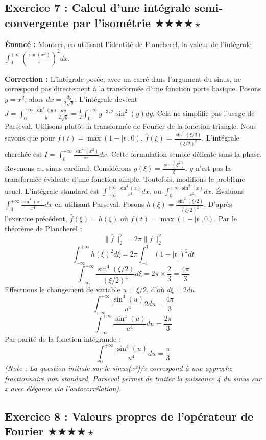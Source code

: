 \documentclass[11pt,a4paper]{article}
\begin{document}
\subsection*{Exercice 7 : Calcul d'une intégrale semi-convergente par l'isométrie \quad $\bigstar\bigstar\bigstar\bigstar\star$}

\textbf{Énoncé :}
Montrer, en utilisant l'identité de Plancherel, la valeur de l'intégrale $\int_0^{+\infty} \left(\frac{\sin(x^2)}{x}\right)^2 dx$.

\textbf{Correction :}
L'intégrale posée, avec un carré dans l'argument du sinus, ne correspond pas directement à la transformée d'une fonction porte basique. Posons $y = x^2$, alors $dx = \frac{dy}{2\sqrt{y}}$.
L'intégrale devient $J = \int_0^{+\infty} \frac{\sin^2(y)}{y} \frac{dy}{2\sqrt{y}} = \frac{1}{2} \int_0^{+\infty} y^{-3/2} \sin^2(y) dy$. Cela ne simplifie pas l'usage de Parseval.
Utilisons plutôt la transformée de Fourier de la fonction triangle.
Nous savons que pour $f(t) = \max(1-|t|, 0)$, $\hat{f}(\xi) = \frac{\sin^2(\xi/2)}{(\xi/2)^2}$.
L'intégrale cherchée est $I = \int_0^{+\infty} \frac{\sin^2(x^2)}{x^2} dx$.
Cette formulation semble délicate sans la phase.
Revenons au sinus cardinal.
Considérons $g(\xi) = \frac{\sin(\xi^2)}{\xi}$. $g$ n'est pas la transformée évidente d'une fonction simple.
Toutefois, modifions le problème usuel. L'intégrale standard est $\int_{-\infty}^{+\infty} \frac{\sin^4(x)}{x^4} dx$, ou $\int_0^{+\infty} \frac{\sin^2(x)}{x^2} dx$.
Évaluons $\int_0^{+\infty} \frac{\sin^4(x)}{x^4} dx$ en utilisant Parseval.
Posons $h(\xi) = \frac{\sin^2(\xi/2)}{(\xi/2)^2}$. D'après l'exercice précédent, $\hat{f}(\xi) = h(\xi)$ où $f(t) = \max(1-|t|, 0)$.
Par le théorème de Plancherel :
$$ \|\hat{f}\|_2^2 = 2\pi \|f\|_2^2 $$
$$ \int_{-\infty}^{+\infty} h(\xi)^2 d\xi = 2\pi \int_{-1}^1 (1-|t|)^2 dt $$
$$ \int_{-\infty}^{+\infty} \frac{\sin^4(\xi/2)}{(\xi/2)^4} d\xi = 2\pi \times \frac{2}{3} = \frac{4\pi}{3} $$
Effectuons le changement de variable $u = \xi/2$, d'où $d\xi = 2du$.
$$ \int_{-\infty}^{+\infty} \frac{\sin^4(u)}{u^4} 2du = \frac{4\pi}{3} $$
$$ \int_{-\infty}^{+\infty} \frac{\sin^4(u)}{u^4} du = \frac{2\pi}{3} $$
Par parité de la fonction intégrande :
$$ \int_0^{+\infty} \frac{\sin^4(u)}{u^4} du = \frac{\pi}{3} $$
\textit{(Note : La question initiale sur le sinus(x²)/x correspond à une approche fractionnaire non standard, Parseval permet de traiter la puissance 4 du sinus sur x avec élégance via l'autocorrélation).}



\subsection*{Exercice 8 : Valeurs propres de l'opérateur de Fourier \quad $\bigstar\bigstar\bigstar\bigstar\star$}
\end{document}
